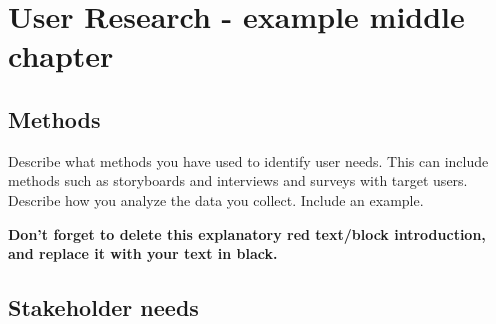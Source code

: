 \chapter{User Research - example middle chapter} %

\section{Methods} %

\begin{tcolorbox}[      %
    boxrule=0pt,        %
    colback=white,      %
    coltext=red         %
]                       %
    Describe what methods you have used to identify user needs. This can include methods such as storyboards and interviews and surveys with target users. Describe how you analyze the data you collect. Include an example. 
    
    \vspace{15pt}       %
    \begin{center}      %
    \textbf{Don't forget to delete this explanatory red text/block introduction, and replace it with your text in black.}
    \end{center}        %
\end{tcolorbox}         %

\section{Stakeholder needs} %

